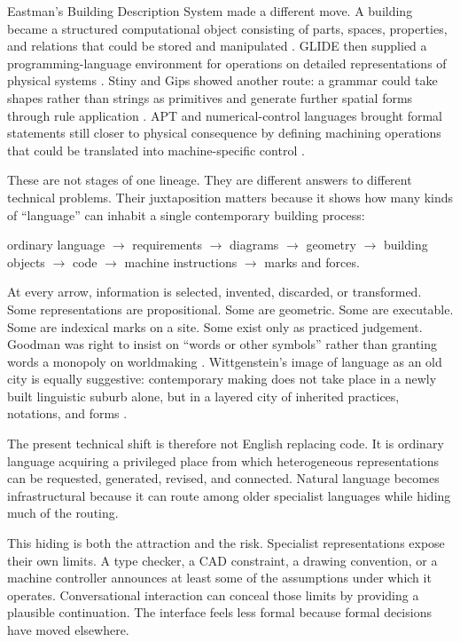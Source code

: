 \documentclass[11pt]{article}
\begin{document}
Eastman's Building Description System made a different move. A building became a structured computational object consisting of parts, spaces, properties, and relations that could be stored and manipulated \citep{eastman1974bds}. GLIDE then supplied a programming-language environment for operations on detailed representations of physical systems \citep{eastman1977glide}. Stiny and Gips showed another route: a grammar could take shapes rather than strings as primitives and generate further spatial forms through rule application \citep{stinygips1972shape}. APT and numerical-control languages brought formal statements still closer to physical consequence by defining machining operations that could be translated into machine-specific control \citep{smith1980apt}.

These are not stages of one lineage. They are different answers to different technical problems. Their juxtaposition matters because it shows how many kinds of ``language'' can inhabit a single contemporary building process:

\begin{center}
ordinary language $\rightarrow$ requirements $\rightarrow$ diagrams $\rightarrow$ geometry $\rightarrow$ building objects $\rightarrow$ code $\rightarrow$ machine instructions $\rightarrow$ marks and forces.
\end{center}

At every arrow, information is selected, invented, discarded, or transformed. Some representations are propositional. Some are geometric. Some are executable. Some are indexical marks on a site. Some exist only as practiced judgement. Goodman was right to insist on ``words or other symbols'' rather than granting words a monopoly on worldmaking \citep{goodman1978ways}. Wittgenstein's image of language as an old city is equally suggestive: contemporary making does not take place in a newly built linguistic suburb alone, but in a layered city of inherited practices, notations, and forms \citep[\S18]{wittgenstein2009investigations}.

The present technical shift is therefore not English replacing code. It is ordinary language acquiring a privileged place from which heterogeneous representations can be requested, generated, revised, and connected. Natural language becomes infrastructural because it can route among older specialist languages while hiding much of the routing.

This hiding is both the attraction and the risk. Specialist representations expose their own limits. A type checker, a CAD constraint, a drawing convention, or a machine controller announces at least some of the assumptions under which it operates. Conversational interaction can conceal those limits by providing a plausible continuation. The interface feels less formal because formal decisions have moved elsewhere.
\end{document}
